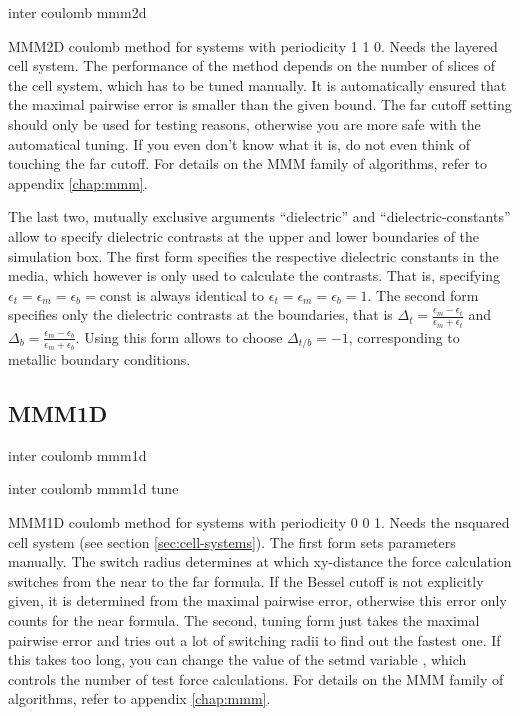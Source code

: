 \begin{essyntax}
 inter coulomb mmm2d 
\end{essyntax}
MMM2D coulomb method for systems with periodicity 1 1 0. Needs the
layered cell system. The performance of the method depends on the
number of slices of the cell system, which has to be tuned manually.
It is automatically ensured that the maximal pairwise error is smaller
than the given bound. The far cutoff setting should only be used for
testing reasons, otherwise you are more safe with the automatical
tuning. If you even don't know what it is, do not even think of
touching the far cutoff. For details on the MMM family of algorithms,
refer to appendix \vref{chap:mmm}.

The last two, mutually exclusive arguments ``dielectric'' and
``dielectric-constants'' allow to specify dielectric contrasts at the
upper and lower boundaries of the simulation box. The first form
specifies the respective dielectric constants in the media, which
however is only used to calculate the contrasts. That is, specifying 
$\epsilon_t=\epsilon_m=\epsilon_b=\text{const}$ is always identical to
$\epsilon_t=\epsilon_m=\epsilon_b=1$. The second form specifies only
the dielectric contrasts at the boundaries, that is
$\Delta_t=\frac{\epsilon_m-\epsilon_t}{\epsilon_m+\epsilon_t}$ and
$\Delta_b=\frac{\epsilon_m-\epsilon_b}{\epsilon_m+\epsilon_b}$. Using
this form allows to choose $\Delta_{t/b}=-1$, corresponding to
metallic boundary conditions.

\subsection{MMM1D}

\begin{essyntax}
  inter coulomb mmm1d 
   

  inter coulomb mmm1d tune 
\end{essyntax}
MMM1D coulomb method for systems with periodicity 0 0 1. Needs the
nsquared cell system (see section \vref{sec:cell-systems}). The first
form sets parameters manually. The switch radius determines at which
xy-distance the force calculation switches from the near to the far
formula. If the Bessel cutoff is not explicitly given, it is
determined from the maximal pairwise error, otherwise this error only
counts for the near formula. The second, tuning form just takes the
maximal pairwise error and tries out a lot of switching radii to find
out the fastest one. If this takes too long, you can change the value
of the setmd variable , which controls the number of
test force calculations. For details on the MMM family of algorithms,
refer to appendix \vref{chap:mmm}.

